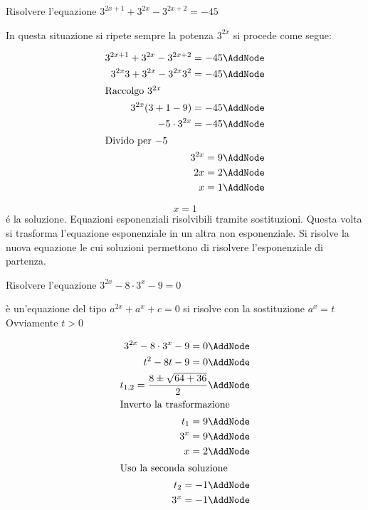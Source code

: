 \begin{esempiot}{}{}
	Risolvere l'equazione $3^{2x+1}+3^{2x}-3^{2x+2}=-45$
\end{esempiot}
	In questa situazione si ripete sempre la potenza $3^{2x}$  si procede come segue:
	\begin{NodesList}[margin=4cm]
		\begin{align*}
			3^{2x+1}+3^{2x}-3^{2x+2}=-45\AddNode\\
			3^{2x}3+3^{2x}-3^{2x}3^2=-45\AddNode\\
			\intertext{\hfil Raccolgo $3^{2x}$}
			3^{2x}(3+1-9)=-45\AddNode\\
			-5\cdot 3^{2x}=-45\AddNode\\
			\intertext{\hfil Divido per $-5$}
			3^{2x}=9\AddNode\\
			2x=2\AddNode\\
			x=1\AddNode
		\end{align*}
	\end{NodesList}
	\[x=1\]
	\'{e} la soluzione.
Equazioni esponenziali risolvibili tramite sostituzioni. Questa volta si trasforma l'equazione esponenziale in un altra non esponenziale. Si risolve la nuova equazione le cui soluzioni permettono di risolvere l'esponenziale di partenza.
\begin{esempiot}{}{}
	Risolvere l'equazione $3^{2x}-8\cdot 3^x-9=0$
\end{esempiot}
	 è un'equazione del tipo $a^{2x}+a^{x}+c=0$ si risolve con la sostituzione $a^{x}=t$ Ovviamente $t>0$ 
	\begin{NodesList} [margin=4cm]
		\begin{align*}
			3^{2x}-8\cdot 3^x-9=0\AddNode\\
			t^2-8t-9=0\AddNode\\
			t_{1,2}=\dfrac{8\pm\sqrt{64+36}}{2}\AddNode\\
			\intertext{\hfil Inverto la trasformazione}
			t_{1}=9\AddNode\\
			3^{x}=9\AddNode\\
			x=2\AddNode\\
			\intertext{\hfil Uso la seconda soluzione}
			t_{2}=-1\AddNode\\
			3^x=-1\AddNode
		\end{align*}
		\LinkNodes{}%
	\end{NodesList}
